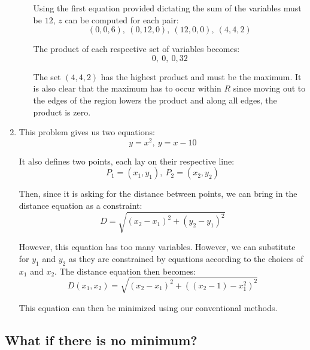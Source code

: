 \documentclass{article}
\begin{document}
\begin{enumerate}[1.]
\begin{enumerate}[a.]
        Using the first equation provided dictating the sum of the variables
        must be $12$, $z$ can be computed for each pair:
        $$ (0, 0, 6),\ (0, 12, 0),\ (12, 0, 0),\ (4, 4, 2) $$

        The product of each respective set of variables becomes:
        $$ 0,\ 0,\ 0, 32 $$

        The set $(4, 4, 2)$ has the highest product and must be the maximum. It
        is also clear that the maximum has to occur within $R$ since moving out
        to the edges of the region lowers the product and along all edges, the
        product is zero.
    \end{enumerate}
  \item This problem gives us two equations:
    $$ y = x^{2},\ y = x - 10 $$

    It also defines two points, each lay on their respective line:
    $$ P_{1} = (x_{1}, y_{1}),\ P_{2} = (x_{2}, y_{2}) $$

    Then, since it is asking for the distance between points, we can bring in
    the distance equation as a constraint:
    $$ D = \sqrt{(x_{2} - x_{1})^{2} + (y_{2} - y_{1})^{2}} $$

    However, this equation has too many variables. However, we can substitute
    for $y_{1}$ and $y_{2}$ as they are constrained by equations according to
    the choices of $x_{1}$ and $x_{2}$. The distance equation then becomes:
    $$ D(x_{1}, x_{2}) = \sqrt{(x_{2} - x_{1})^{2} + \left((x_{2} - 1) -
    x_{1}^{2}\right)^{2}} $$

    This equation can then be minimized using our conventional methods.
\end{enumerate}

\subsection{What if there is no minimum?}
\end{document}
